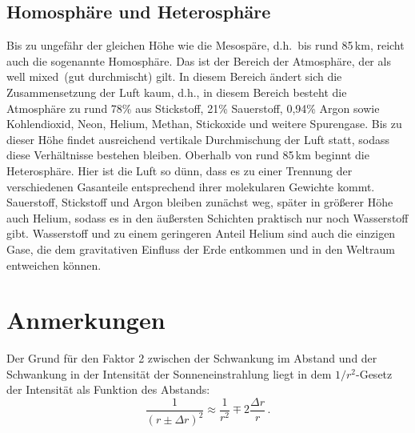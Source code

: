 \subsection{Homosph\"are und Heterosph\"are}

Bis zu ungef\"ahr der gleichen H\"ohe wie die Mesosp\"are, d.h.\ bis rund 85\,km, 
reicht auch die sogenannte
Homosph\"are. Das ist der Bereich der Atmosph\"are, der als \glqq well mixed\grqq\ (gut
durchmischt) gilt. In diesem Bereich \"andert sich die Zusammensetzung der Luft
kaum, d.h., in diesem Bereich besteht die Atmosph\"are 
zu rund 78\% aus Stickstoff, 21\% Sauerstoff, 0,94\% Argon   
sowie Kohlendioxid, Neon, Helium, Methan, Stickoxide und weitere Spurengase. Bis zu dieser H\"ohe
findet ausreichend vertikale Durchmischung der Luft statt, sodass diese Verh\"altnisse
bestehen bleiben. Oberhalb von rund 85\,km beginnt die Heterosph\"are. Hier ist die Luft
so d\"unn, dass es zu einer Trennung der verschiedenen Gasanteile entsprechend
ihrer molekularen Gewichte kommt. Sauerstoff, Stickstoff und Argon bleiben zun\"achst
weg, sp\"ater in gr\"o\ss erer H\"ohe auch Helium, sodass es in den \"au\ss ersten
Schichten praktisch nur noch Wasserstoff gibt. Wasserstoff und zu einem geringeren  
Anteil Helium sind auch die einzigen Gase, die dem gravitativen Einfluss der Erde
entkommen und in den Weltraum entweichen k\"onnen.



\section{Anmerkungen}

\begin{anmerkungen}
\item
\label{Anm-1}%
Der Grund f\"ur den Faktor 2 zwischen der Schwankung im Abstand und
der Schwankung in der Intensit\"at der Sonneneinstrahlung liegt in dem $1/r^2$-Gesetz
der Intensit\"at als Funktion des Abstands:
\begin{equation}
        \frac{1}{(r\pm \Delta r)^2} \approx \frac{1}{r^2} \mp 2 \frac{\Delta r}{r} \, .
\end{equation}

\end{anmerkungen}




